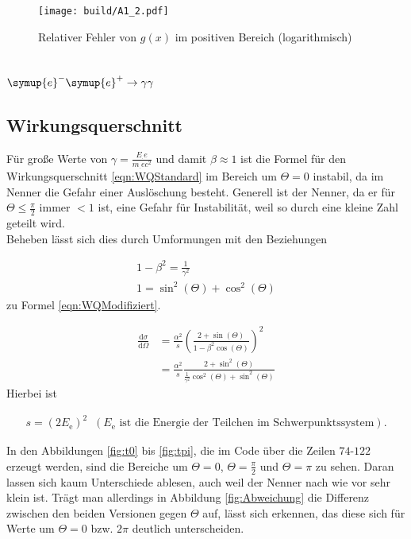 \begin{figure}
  \centering
  \texttt{[image: build/A1\_2.pdf]}
  \caption{Relativer Fehler von $g(x)$ im positiven Bereich (logarithmisch)}
  \label{fig:FehlerGlog}
\end{figure}

\newpage

\section{\texorpdfstring{$\symup{e}^-\symup{e}^+\rightarrow\gamma \gamma$}{Paarvernichtung}}
\subsection{Wirkungsquerschnitt}
Für große Werte von $\gamma=\frac{E_.e}{m_.ec^2}$ und damit $\beta\approx 1$ ist die Formel für den Wirkungsquerschnitt \eqref{eqn:WQStandard} im Bereich um $\Theta=0$ instabil, da im Nenner die Gefahr einer Auslöschung besteht. Generell ist der Nenner, da er für $\Theta\leq \frac{\pi}{2}$ immer $<1$ ist, eine Gefahr für Instabilität, weil so durch eine kleine Zahl geteilt wird.\\
Beheben lässt sich dies durch Umformungen mit den Beziehungen

\begin{gather}
  1-\beta^2=\frac{1}{\gamma^2}\nonumber\\
  1=\sin^2(\Theta)+\cos^2(\Theta)\nonumber
\end{gather}
zu Formel \eqref{eqn:WQModifiziert}.

\begin{align}
    \frac{\mathrm{d}\sigma}{\mathrm{d}\Omega} &= \frac{\alpha^2}{s} \left(\frac{2+\sin(\Theta)}{1-\beta^2 \cos(\Theta)}\right)^2\label{eqn:WQStandard}\\
&= \frac{\alpha^2}{s}\frac{2+\sin^2(\Theta)}{\frac{1}{\gamma^2}\cos^2(\Theta)+\sin^2(\Theta)}\label{eqn:WQModifiziert}
\end{align}
Hierbei ist

\begin{gather}
  s=(2E_\text{e})^2 \;\;(E_\text{e} \text{ ist die Energie der Teilchen im Schwerpunktssystem})\text{.}\nonumber
\end{gather}

\noindent In den Abbildungen \ref{fig:t0} bis \ref{fig:tpi}, die im Code über die Zeilen $74$-$122$ erzeugt werden, sind die Bereiche um $\Theta=0$, $\Theta=\frac{\pi}{2}$ und $\Theta=\pi$ zu sehen.
Daran lassen sich kaum Unterschiede ablesen, auch weil der Nenner nach wie vor sehr klein ist. Trägt man allerdings in Abbildung \ref{fig:Abweichung} die Differenz zwischen den beiden Versionen gegen $\Theta$ auf, lässt sich erkennen, das diese sich für Werte um $\Theta=0$ bzw. $2\pi$ deutlich unterscheiden.

